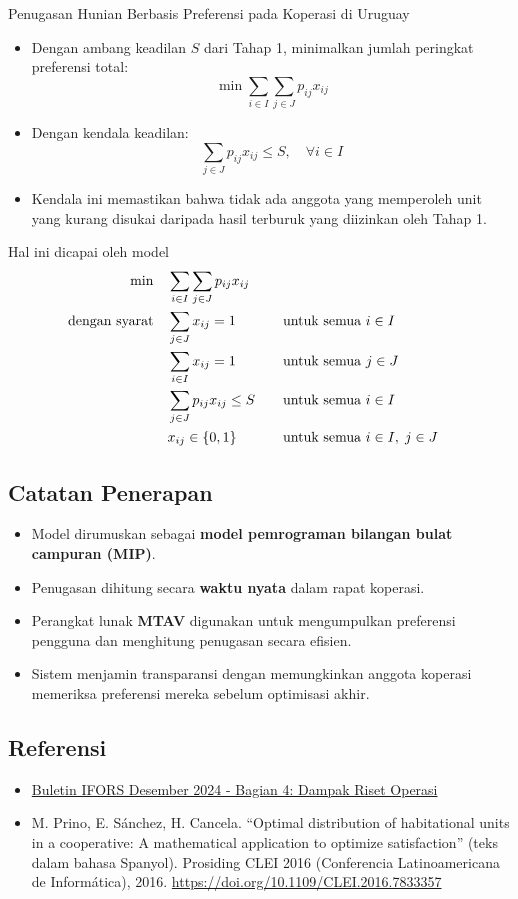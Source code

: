 \begin{casestudybox}{Penugasan Hunian Berbasis Preferensi pada Koperasi di Uruguay}
\begin{itemize}
    \item Dengan ambang keadilan $S$ dari Tahap 1, minimalkan jumlah peringkat preferensi total:
    \[ \min \sum_{i \in I} \sum_{j \in J} p_{ij} x_{ij} \]
    \item Dengan kendala keadilan:
    \[ \sum_{j \in J} p_{ij} x_{ij} \leq S, \quad \forall i \in I \]
    \item Kendala ini memastikan bahwa tidak ada anggota yang memperoleh unit yang kurang disukai daripada hasil terburuk yang diizinkan oleh Tahap 1.
\end{itemize}
Hal ini dicapai oleh model
\begin{align*}
\min \quad & \sum_{i \in I} \sum_{j \in J} p_{i j} x_{i j} \\
\mbox{dengan syarat}\quad        & \sum_{j \in J} x_{i j} = 1 &&\quad \mbox{untuk semua } i \in I \\
                 & \sum_{i \in I} x_{i j} = 1 &&\quad \mbox{untuk semua } j \in J \\
                 & \sum_{j \in J} p_{i j} x_{i j} \leq S &&\quad \mbox{untuk semua } i \in I \\
                 & x_{i j} \in \{0,1\} &&\quad \mbox{untuk semua } i \in I, \; j \in J
\end{align*}

\subsection*{Catatan Penerapan}

\begin{itemize}
    \item Model dirumuskan sebagai \textbf{model pemrograman bilangan bulat campuran (MIP)}.
    \item Penugasan dihitung secara \textbf{waktu nyata} dalam rapat koperasi.
    \item Perangkat lunak \textbf{MTAV} digunakan untuk mengumpulkan preferensi pengguna dan menghitung penugasan secara efisien.
    \item Sistem menjamin transparansi dengan memungkinkan anggota koperasi memeriksa preferensi mereka sebelum optimisasi akhir.
\end{itemize}

\subsection*{Referensi}
\begin{itemize}
\item \href{https://ifors.org/newsletter/ifors-news-dec-2024.pdf}{Buletin IFORS Desember 2024 - Bagian 4: Dampak Riset Operasi}
\item M. Prino, E. Sánchez, H. Cancela. “Optimal distribution of habitational units in a cooperative: A mathematical application to optimize satisfaction” (teks dalam bahasa Spanyol). Prosiding CLEI 2016 (Conferencia Latinoamericana de Informática), 2016. \url{https://doi.org/10.1109/CLEI.2016.7833357}
\end{itemize}

\end{casestudybox}

